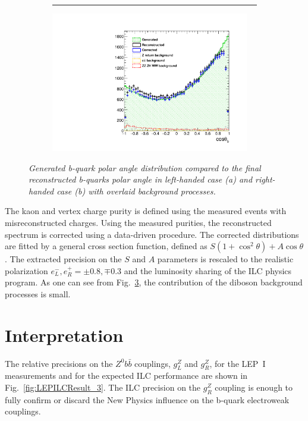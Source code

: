 \documentclass{PoS}
\begin{document}
\begin{figure}
\begin{subfigure}{0.5\textwidth}
{{				\rule{0ex}{0.51in}%
			}
			\rule{1.8in}{0ex}}
		\caption{\label{fig:BAsymmetryFinal_a_3} }
	\end{subfigure}%
	\begin{subfigure}{0.5\textwidth}
		\centering
		\includegraphics[width=0.95\textwidth]{../ILD/plots/basymmetry-final-right.pdf}
		\caption{\label{fig:BAsymmetryFinal_b_3} }
	\end{subfigure}
	\caption{\sl Generated b-quark polar angle distribution compared to the final reconstructed b-quarks polar angle in left-handed case (a) and right-handed case (b) with overlaid background processes.  }
	\label{fig:BAsymmetryFinal_3}
\end{figure}

The kaon and vertex charge purity is defined using the measured events with misreconstructed charges. Using the measured purities, the reconstructed spectrum is corrected using a data-driven procedure.
The corrected distributions are fitted by a general cross section function, defined as ${	S (1+\cos^2\theta) + A \cos\theta}$. The extracted precision on the $S$ and $A$ parameters is rescaled to the realistic polarization $e^-_L, e^+_R = \pm0.8, \mp0.3$ and the luminosity sharing of the ILC physics program.
As one can see from Fig.~\ref{fig:BAsymmetryFinal_3}, the contribution of the diboson background processes is small. 

\section{Interpretation}

The relative precisions on the $Z^0b\bar{b}$ couplings, $g_L^Z$ and $g_R^Z$, for the LEP~I measurements and for the expected ILC performance are shown in Fig.~\ref{fig:LEPILCResult_3}. 
The ILC precision on the $g_R^Z$ coupling is enough to fully confirm or discard the New Physics influence on the b-quark electroweak couplings. 
\end{document}
